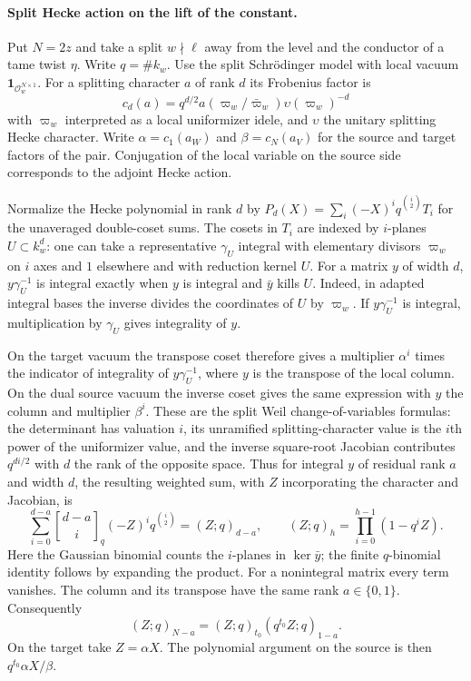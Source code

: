 \paragraph{Split Hecke action on the lift of the constant.}
Put $N=2z$ and take a split $w\nmid\ell$ away from the level
and the conductor of a tame twist $\eta$. Write $q=\#k_w$.
Use the split Schr\"odinger model with local vacuum
$\mathbf1_{\mathcal O_w^{N\times1}}$. For a splitting character $a$
of rank $d$ its Frobenius factor is
\[
 c_d(a)=q^{d/2}a(\varpi_w/\bar\varpi_w)\upsilon(\varpi_w)^{-d}
\]
with $\varpi_w$ interpreted as a local uniformizer idele, and
$\upsilon$ the unitary splitting Hecke character. Write
$\alpha=c_1(a_W)$ and $\beta=c_N(a_V)$ for the source and target
factors of the pair. Conjugation of the local variable on the source
side corresponds to the adjoint Hecke action.

Normalize the Hecke polynomial in rank $d$ by
$P_d(X)=\sum_i(-X)^i q^{\binom{i}{2}}T_i$ for the unaveraged
double-coset sums. The cosets in $T_i$ are indexed by
$i$-planes $U\subset k_w^d$: one can take a representative
$\gamma_U$ integral with elementary divisors $\varpi_w$ on $i$ axes
and $1$ elsewhere and with reduction kernel $U$.
For a matrix $y$ of width $d$, $y\gamma_U^{-1}$ is integral exactly
when $y$ is integral and $\bar y$ kills $U$. Indeed, in adapted
integral bases the inverse divides the coordinates of $U$ by
$\varpi_w$. If $y\gamma_U^{-1}$ is integral, multiplication by
$\gamma_U$ gives integrality of $y$.

On the target vacuum the transpose coset therefore gives a multiplier
$\alpha^i$ times the indicator of integrality of $y\gamma_U^{-1}$,
where $y$ is the transpose of the local column. On the dual source
vacuum the inverse coset gives the same expression with $y$ the
column and multiplier $\beta^i$. These are the split Weil
change-of-variables formulas: the determinant has valuation $i$,
its unramified splitting-character value is the $i$th power of the
uniformizer value, and the inverse square-root Jacobian contributes
$q^{di/2}$ with $d$ the rank of the opposite space. Thus for integral
$y$ of residual rank $a$ and width $d$, the resulting weighted sum,
with $Z$ incorporating the character and Jacobian, is
\[
 \sum_{i=0}^{d-a}{d-a\brack i}_q(-Z)^i q^{\binom{i}{2}}
 = (Z;q)_{d-a},\qquad (Z;q)_h=\prod_{i=0}^{h-1}(1-q^iZ).
\]
Here the Gaussian binomial counts the $i$-planes in $\ker\bar y$;
the finite $q$-binomial identity follows by expanding the product.
For a nonintegral matrix every term vanishes. The column and its
transpose have the same rank $a\in\{0,1\}$. Consequently
\[
 (Z;q)_{N-a}=(Z;q)_{t_0}(q^{t_0}Z;q)_{1-a}.
\]
On the target take $Z=\alpha X$. The polynomial argument on the
source is then $q^{t_0}\alpha X/\beta$.


